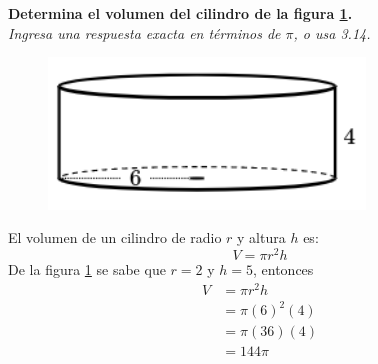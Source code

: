 \question[10] \textbf{Determina el volumen del cilindro de la figura \ref{fig:vol_cil_05}.}\\
\textit{Ingresa una respuesta exacta en términos de $\pi$, o usa 3.14.}

\begin{minipage}{0.3\linewidth}
    \begin{figure}[H]
        \begin{center}
            \includegraphics[width=0.75\textwidth]{../images/vol_cil_05.png}
        \end{center}
        \caption{}
        \label{fig:vol_cil_05}
    \end{figure}
\end{minipage}
\begin{minipage}{0.7\linewidth}
    \begin{solutionbox}{6cm}        El volumen de un cilindro de radio $r$ y altura $h$ es:
        \begin{equation*}
            V = \pi r^2 h
        \end{equation*}
        De la figura \ref{fig:vol_cil_05} se sabe que $r=2$ y $h=5$, entonces
        \begin{equation*}
            \begin{split}
                V & = \pi r^2 h\\
                & = \pi (6)^2 (4)\\
                & = \pi (36) (4)\\
                & = 144\pi
            \end{split}
        \end{equation*}
    \end{solutionbox}
\end{minipage}